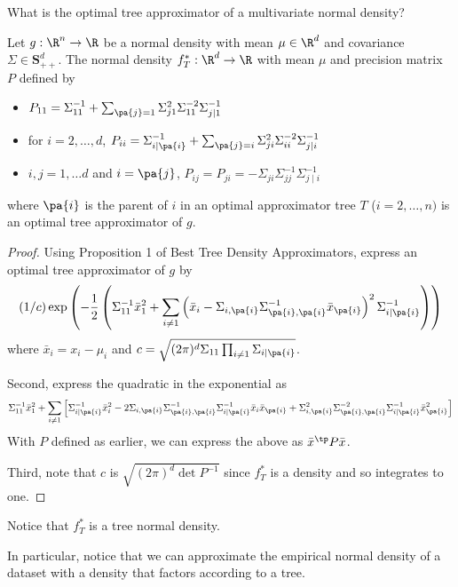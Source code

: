 

What is the optimal tree approximator of a multivariate normal density?


\begin{prop}


Let $g: \R^n \to \R$ be a normal density with mean $\mu \in \R^d$ and covariance $\Sigma \in \mathbf{S}^d_{++}$.
The normal density $f^*_T: \R^d \to \R$ with mean $\mu$ and precision matrix $P$ defined by
  \begin{itemize}
    \item $P_{11} = \Sigma_{11}^{-1} + \sum_{\pa{j} = 1}
\Sigma_{j1}^2\Sigma_{11}^{-2}\Sigma_{j\mid 1}^{-1}$
      \item for $i = 2, \dots, d$, $P_{ii} = \Sigma_{i\mid\pa{i}}^{-1} + \sum_{\pa{j} = i} \Sigma_{ji}^2\Sigma_{ii}^{-2}\Sigma_{j\mid i}^{-1}$
      \item $i, j = 1, \dots d$ and $i = \pa{j}$, $P_{ij} = P_{ji} = -\Sigma_{ji}\Sigma_{jj}^{-1}\Sigma_{j \mid i}^{-1}$
  \end{itemize}
  where $\pa{i}$ is the parent of $i$ in an optimal approximator tree $T$ ($i = 2, \dots, n)$ is an optimal tree approximator of $g$.

\begin{proof}

Using Proposition 1 of Best Tree Density Approximators, express an optimal tree approximator of $g$ by
$$
(1/c)
\exp\left(
  -\frac{1}{2}
  \left(
    \Sigma_{11}^{-1}\bar{x}_1^2 +
      \sum_{i \neq 1}
            \left(\bar{x}_i - \Sigma_{i,\pa{i}}\Sigma_{\pa{i},\pa{i}}^{-1}\bar{x}_{\pa{i}}\right)^2\Sigma_{i\mid\pa{i}}^{-1}
      \right)
    \right)
$$
where $\bar{x}_i = x_i - \mu_i$ and $c = \sqrt{(2\pi)^d\Sigma_{11} \prod_{i \neq 1} \Sigma_{i \mid \pa{i}}}$.

Second, express the quadratic in the exponential as
$$
  \Sigma_{11}^{-1}\bar{x}_1^2 +
    \sum_{i \neq 1}
    \left[
      \Sigma_{i\mid\pa{i}}^{-1}
      \bar{x}_i^2
      -
      2
      \Sigma_{i,\pa{i}}\Sigma_{\pa{i},\pa{i}}^{-1}\Sigma_{i\mid\pa{i}}^{-1}
      \bar{x}_i\bar{x}_{\pa{i}}
      +
      \Sigma_{i,\pa{i}}^2\Sigma_{\pa{i},\pa{i}}^{-2}\Sigma_{i\mid\pa{i}}^{-1}
      \bar{x}_{\pa{i}}^2
    \right]
$$
With $P$ defined as earlier, we can express the above as $\bar{x}^{\tp} P \bar{x}$.

Third, note that $c$ is $\sqrt{(2\pi)^d\det P^{-1}}$ since $f^*_T$ is a density and so integrates to one.

\end{proof}

\end{prop}

Notice that $f^*_T$ is a tree normal density.


In particular, notice that we can approximate the empirical normal density of a dataset with a density that factors according to a tree.
